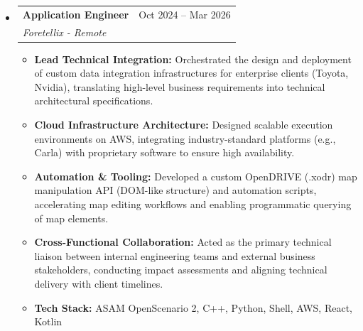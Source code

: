 \documentclass[letterpaper,11pt]{article}
\makeatletter
\newcommand{\resumeItem}[1]{
  \item\small{#1}
}
\newcommand{\resumeSubheading}[4]{
  \vspace{1pt}\item
    \begin{tabular*}{0.97\textwidth}[t]{l@{\extracolsep{\fill}}r}
      \textbf{#1} & #2 \\
      \textit{#3} & \textit{#4} \\
    \end{tabular*}\vspace{-4pt}
}
\makeatother
\begin{document}
\begin{itemize}[leftmargin=0.15in, label={}]
    \resumeSubheading
        {Application Engineer}{Oct 2024 -- Mar 2026}
        {Foretellix - Remote}{}
        \begin{itemize}[leftmargin=0.25in, label=\textbullet, itemsep=2pt]
            \resumeItem{\textbf{Lead Technical Integration:} Orchestrated the design and deployment of custom data integration infrastructures for enterprise clients (Toyota, Nvidia), translating high-level business requirements into technical architectural specifications.}
            \resumeItem{\textbf{Cloud Infrastructure Architecture:} Designed scalable execution environments on AWS, integrating industry-standard platforms (e.g., Carla) with proprietary software to ensure high availability.}
            \resumeItem{\textbf{Automation \& Tooling:} Developed a custom OpenDRIVE (.xodr) map manipulation API (DOM-like structure) and automation scripts, accelerating map editing workflows and enabling programmatic querying of map elements.}
            \resumeItem{\textbf{Cross-Functional Collaboration:} Acted as the primary technical liaison between internal engineering teams and external business stakeholders, conducting impact assessments and aligning technical delivery with client timelines.}
            \resumeItem{\textbf{Tech Stack:} ASAM OpenScenario 2, C++, Python, Shell, AWS, React, Kotlin}
        \end{itemize}


\end{itemize}
\end{document}
